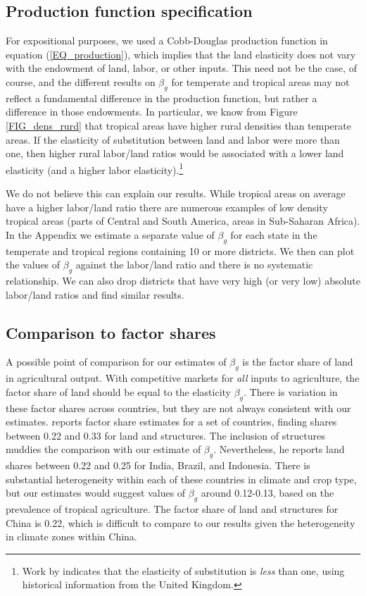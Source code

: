\documentclass[11pt]{article}
\begin{document}
\subsection{Production function specification}
For expositional purposes, we used a Cobb-Douglas production function in equation (\ref{EQ_production}), which implies that the land elasticity does not vary with the endowment of land, labor, or other inputs. This need not be the case, of course, and the different results on $\beta_g$ for temperate and tropical areas may not reflect a fundamental difference in the production function, but rather a difference in those endowments. In particular, we know from Figure \ref{FIG_dens_rurd} that tropical areas have higher rural densities than temperate areas. If the elasticity of substitution between land and labor were more than one, then higher rural labor/land ratios would be associated with a lower land elasticity (and a higher labor elasticity).\footnote{Work by \citet{wilde2012} indicates that the elasticity of substitution is \textit{less} than one, using historical information from the United Kingdom.}

We do not believe this can explain our results. While tropical areas on average have a higher labor/land ratio there are numerous examples of low density tropical areas (parts of Central and South America, areas in Sub-Saharan Africa). In the Appendix we estimate a separate value of $\beta_g$ for each state in the temperate and tropical regions containing 10 or more districts. We then can plot the values of $\beta_g$ against the labor/land ratio and there is no systematic relationship. We can also drop districts that have very high (or very low) absolute labor/land ratios and find similar results.

\subsection{Comparison to factor shares}
A possible point of comparison for our estimates of $\beta_g$ is the factor share of land in agricultural output. With competitive markets for \textit{all} inputs to agriculture, the factor share of land should be equal to the elasticity $\beta_g$. There is variation in these factor shares across countries, but they are not always consistent with our estimates. \citet{fuglie2010} reports factor share estimates for a set of countries, finding shares between 0.22 and 0.33 for land and structures. The inclusion of structures muddies the comparison with our estimate of $\beta_g$. Nevertheless, he reports land shares between 0.22 and 0.25 for India, Brazil, and Indonesia. There is substantial heterogeneity within each of these countries in climate and crop type, but our estimates would suggest values of $\beta_g$ around 0.12-0.13, based on the prevalence of tropical agriculture. The factor share of land and structures for China is 0.22, which is difficult to compare to our results given the heterogeneity in climate zones within China.
\end{document}

